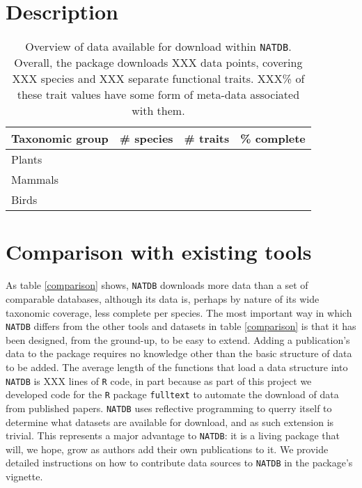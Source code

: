 \documentclass[12pt]{report}
\newcommand{\R}{\texttt{R}\xspace}
\newcommand{\natdb}{\texttt{NATDB}\xspace}
\begin{document}
\section{Description}



\begin{table}
  \begin{tabular}{llll}
    Taxonomic group & \# species & \# traits & \% complete \\ \hline
    Plants \\
    Mammals \\
    Birds \\ \hline
  \end{tabular}
  \label{overview}
  \caption{Overview of data available for download within
    \natdb. Overall, the package downloads XXX data points, covering
    XXX species and XXX separate functional traits. XXX\% of these
    trait values have some form of meta-data associated with them.}
\end{table}

\section{Comparison with existing tools}
As table \ref{comparison} shows, \natdb downloads more data than a set
of comparable databases, although its data is, perhaps by nature of
its wide taxonomic coverage, less complete per species. The most
important way in which \natdb differs from the other tools and
datasets in table \ref{comparison} is that it has been designed, from
the ground-up, to be easy to extend. Adding a publication's data to
the package requires no knowledge other than the basic structure of
data to be added. The average length of the functions that load a data
structure into \natdb is XXX lines of \R code, in part because as part
of this project we developed code for the \R package \texttt{fulltext}
\autocite{Chamberlain2015} to automate the download of data from
published papers. \natdb uses reflective programming to querry itself
to determine what datasets are available for download, and as such
extension is trivial. This represents a major advantage to \natdb: it
is a living package that will, we hope, grow as authors add their own
publications to it. We provide detailed instructions on how to
contribute data sources to \natdb in the package's vignette.
\end{document}
